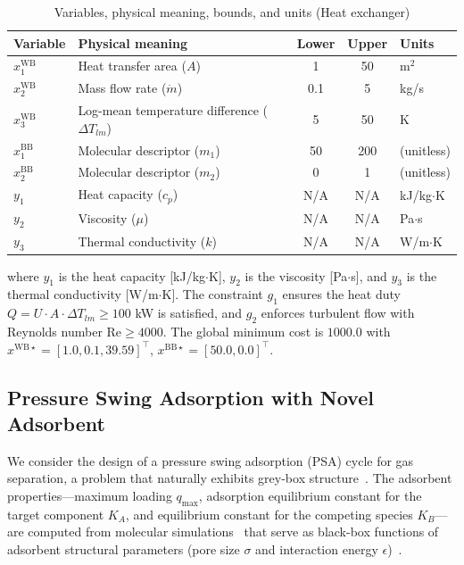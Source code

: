 \documentclass[12pt,a4paper]{article}%
\theoremstyle{plain}%
\theoremstyle{remark}%
\theoremstyle{definition}%
\def\WB{\mathrm{WB}}
\def\BB{\mathrm{BB}}
\providecommand{\DIFaddtex}[1]{{\protect\color{blue}\uwave{#1}}} %
\providecommand{\DIFdeltex}[1]{{\protect\color{red}\sout{#1}}}                      %
\providecommand{\DIFaddbegin}{} %
\providecommand{\DIFaddend}{} %
\providecommand{\DIFdelbegin}{} %
\providecommand{\DIFdelend}{} %
\providecommand{\DIFadd}[1]{\texorpdfstring{\DIFaddtex{#1}}{#1}} %
\providecommand{\DIFdel}[1]{\texorpdfstring{\DIFdeltex{#1}}{}} %
\newcommand{\DIFscaledelfig}{0.5}
\newlength{\DIFdelgraphicswidth} %
\newlength{\DIFdelgraphicsheight} %
\newcommand{\DIFaddincludegraphics}[2][]{{\color{blue}\fbox{\DIFOincludegraphics[#1]{#2}}}} %
\newcommand{\DIFdelincludegraphics}[2][]{%
\sbox{\DIFdelgraphicsbox}{\DIFOincludegraphics[#1]{#2}}%
\settoboxwidth{\DIFdelgraphicswidth}{\DIFdelgraphicsbox} %
\settoboxtotalheight{\DIFdelgraphicsheight}{\DIFdelgraphicsbox} %
\scalebox{\DIFscaledelfig}{%
\parbox[b]{\DIFdelgraphicswidth}{\usebox{\DIFdelgraphicsbox}\\[-\baselineskip] \rule{\DIFdelgraphicswidth}{0em}}\llap{\resizebox{\DIFdelgraphicswidth}{\DIFdelgraphicsheight}{%
\setlength{\unitlength}{\DIFdelgraphicswidth}%
\begin{picture}(1,1)%
\thicklines\linethickness{2pt} %
{\color[rgb]{1,0,0}\put(0,0){\framebox(1,1){}}}%
{\color[rgb]{1,0,0}\put(0,0){\line( 1,1){1}}}%
{\color[rgb]{1,0,0}\put(0,1){\line(1,-1){1}}}%
\end{picture}%
}\hspace*{3pt}}} %
} %
\DeclareRobustCommand{\DIFaddbegin}{\DIFOaddbegin \let\includegraphics\DIFaddincludegraphics} %
\DeclareRobustCommand{\DIFaddend}{\DIFOaddend \let\includegraphics\DIFOincludegraphics} %
\DeclareRobustCommand{\DIFdelbegin}{\DIFOdelbegin \let\includegraphics\DIFdelincludegraphics} %
\DeclareRobustCommand{\DIFdelend}{\DIFOaddend \let\includegraphics\DIFOincludegraphics} %
\begin{document}
\begin{appendices}
\begin{table}[htbp]
\centering
\caption{Variables, physical meaning, bounds, and units (Heat exchanger)}
\label{tab:heat_exchanger_vars}
\begin{tabular}{@{}llccl@{}}
\toprule
Variable & Physical meaning & Lower & Upper & Units \\
\midrule
$x^{\WB}_1$ & Heat transfer area ($A$) & 1 & 50 & m$^2$ \\
$x^{\WB}_2$ & Mass flow rate ($\dot{m}$) & 0.1 & 5 & kg/s \\
$x^{\WB}_3$ & Log-mean temperature difference ($\Delta T_{lm}$) & 5 & 50 & K \\
\midrule
$x^{\BB}_1$ & Molecular descriptor ($m_1$) & 50 & 200 & (unitless) \\
$x^{\BB}_2$ & Molecular descriptor ($m_2$) & 0 & 1 & (unitless) \\
\midrule
$y_1$ & Heat capacity ($c_p$) & N/A & N/A & kJ/kg$\cdot$K \\
$y_2$ & Viscosity ($\mu$) & N/A & N/A & Pa$\cdot$s \\
$y_3$ & Thermal conductivity ($k$) & N/A & N/A & W/m$\cdot$K \\
\bottomrule
\end{tabular}
\end{table}

where $y_1$ is the heat capacity [kJ/kg$\cdot$K], $y_2$ is the viscosity [Pa$\cdot$s], and $y_3$ is the thermal conductivity [W/m$\cdot$K]. The constraint $g_1$ ensures the heat duty $Q = U \cdot A \cdot \Delta T_{lm} \geq 100$ kW is satisfied, and $g_2$ enforces turbulent flow with Reynolds number $\text{Re} \geq 4000$. The global minimum cost \DIFaddbegin \DIFadd{given the parameters in Table~\ref{tab:heat_exchanger_vars} }\DIFaddend is $1000.0$ with \DIFdelbegin \DIFdel{$x^{\WB\star} = [1.0, 0.1, 39.59]^\top$}\DIFdelend \DIFaddbegin \DIFadd{$x^{\WB\star} = [1.0, 0.1, 19.3]^\top$}\DIFaddend , $x^{\BB\star} = [50.0, 0.0]^\top$.

\subsection{Pressure Swing Adsorption with Novel Adsorbent}\label{subsec:app_psa}

We consider the design of a pressure swing adsorption (PSA) cycle for gas separation, a problem that naturally exhibits grey-box structure~\cite{boukouvala2017argonaut,agarwal2010superstructure,ruthven1994psa}. The adsorbent properties---maximum loading $q_{\max}$, adsorption equilibrium constant for the target component $K_A$, and equilibrium constant for the competing species $K_B$---are computed from molecular simulations~\cite{burns2020process,smit2008molecular} that serve as black-box functions of adsorbent structural parameters (pore size $\sigma$ and interaction energy $\epsilon$)~\cite{dubbeldam2019force}.


\end{appendices}
\end{document}
